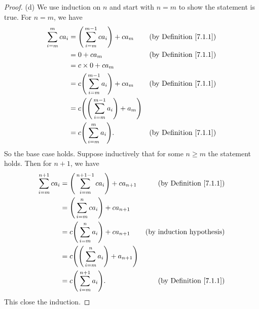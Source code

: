 \begin{proof}{(d)}
We use induction on \(n\) and start with \(n = m\) to show the statement is true.
For \(n = m\), we have
\begin{align*}
\sum_{i = m}^m ca_i &= \Bigg(\sum_{i = m}^{m - 1} ca_i\Bigg) + ca_m & \text{(by Definition \ref{7.1.1})} \\
&= 0 + ca_m & \text{(by Definition \ref{7.1.1})} \\
&= c \times 0 + ca_m \\
&= c\Bigg(\sum_{i = m}^{m - 1} a_i\Bigg) + ca_m & \text{(by Definition \ref{7.1.1})} \\
&= c\Bigg(\Bigg(\sum_{i = m}^{m - 1} a_i\Bigg) + a_m\Bigg) \\
&= c\Bigg(\sum_{i = m}^m a_i\Bigg). & \text{(by Definition \ref{7.1.1})}
\end{align*}
So the base case holds.
Suppose inductively that for some \(n \geq m\) the statement holds.
Then for \(n + 1\), we have
\begin{align*}
\sum_{i = m}^{n + 1} ca_i &= \Bigg(\sum_{i = m}^{n + 1 - 1} ca_i\Bigg) + ca_{n + 1} & \text{(by Definition \ref{7.1.1})} \\
&= \Bigg(\sum_{i = m}^n ca_i\Bigg) + ca_{n + 1} \\
&= c\Bigg(\sum_{i = m}^n a_i\Bigg) + ca_{n + 1} & \text{(by induction hypothesis)} \\
&= c\Bigg(\Bigg(\sum_{i = m}^n a_i\Bigg) + a_{n + 1}\Bigg) \\
&= c\Bigg(\sum_{i = m}^{n + 1} a_i\Bigg). & \text{(by Definition \ref{7.1.1})}
\end{align*}
This close the induction.
\end{proof}

